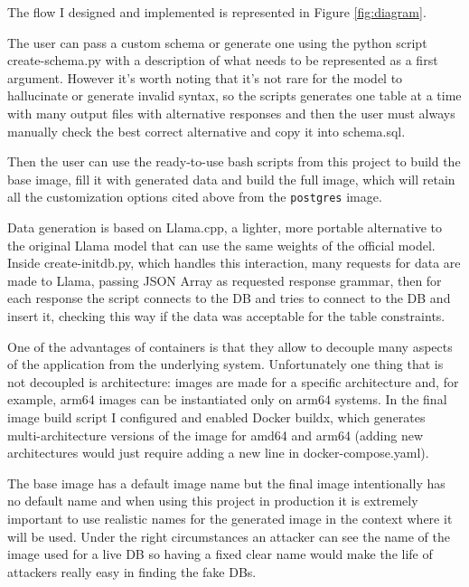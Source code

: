 \documentclass[12pt, letterpaper, twoside]{article}
\begin{document}
The flow I designed and implemented is represented in Figure \ref{fig:diagram}.

The user can pass a custom schema or generate one using the python script create-schema.py with a description of what needs to be represented as a first argument. However it's worth noting that it's not rare for the model to hallucinate or generate invalid syntax, so the  scripts generates one table at a time with many output files with alternative responses and then the user must always manually check the best correct alternative and copy it into schema.sql.

Then the user can use the ready-to-use bash scripts from this project to build the base image, fill it with generated data and build the full image, which will retain all the customization options cited above from the \verb|postgres| image.

Data generation is based on Llama.cpp, a lighter, more portable alternative to the original Llama model that can use the same weights of the official model. Inside create-initdb.py, which handles this interaction, many requests for data are made to Llama, passing JSON Array as requested response grammar, then for each response the script connects to the DB and tries to connect to the DB and insert it, checking this way if the data was acceptable for the table constraints.

One of the advantages of containers is that they allow to decouple many aspects of the application from the underlying system. Unfortunately one thing that is not decoupled is architecture: images are made for a specific architecture and, for example, arm64 images can be instantiated only on arm64 systems. In the final image build script I configured and enabled Docker buildx, which generates multi-architecture versions of the image for amd64 and arm64 (adding new architectures would just require adding a new line in docker-compose.yaml).

The base image has a default image name but the final image intentionally has no default name and when using this project in production it is extremely important to use realistic names for the generated image in the context where it will be used. Under the right circumstances an attacker can see the name of the image used for a live DB so having a fixed clear name would make the life of attackers really easy in finding the fake DBs.
\end{document}
